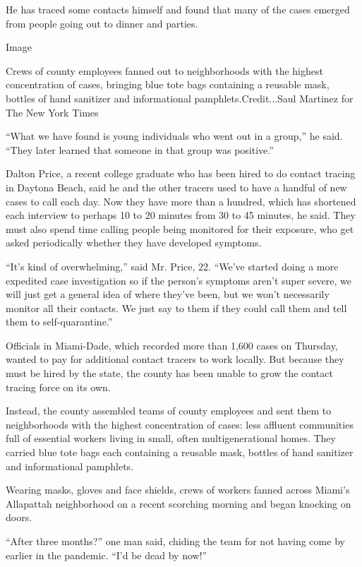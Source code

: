 He has traced some contacts himself and found that many of the cases
emerged from people going out to dinner and parties.

Image

Crews of county employees fanned out to neighborhoods with the highest
concentration of cases, bringing blue tote bags containing a reusable
mask, bottles of hand sanitizer and informational
pamphlets.Credit...Saul Martinez for The New York Times

``What we have found is young individuals who went out in a group,'' he
said. ``They later learned that someone in that group was positive.''

Dalton Price, a recent college graduate who has been hired to do contact
tracing in Daytona Beach, said he and the other tracers used to have a
handful of new cases to call each day. Now they have more than a
hundred, which has shortened each interview to perhaps 10 to 20 minutes
from 30 to 45 minutes, he said. They must also spend time calling people
being monitored for their exposure, who get asked periodically whether
they have developed symptoms.

``It's kind of overwhelming,'' said Mr. Price, 22. ``We've started doing
a more expedited case investigation so if the person's symptoms aren't
super severe, we will just get a general idea of where they've been, but
we won't necessarily monitor all their contacts. We just say to them if
they could call them and tell them to self-quarantine.''

Officials in Miami-Dade, which recorded more than 1,600 cases on
Thursday, wanted to pay for additional contact tracers to work locally.
But because they must be hired by the state, the county has been unable
to grow the contact tracing force on its own.

Instead, the county assembled teams of county employees and sent them to
neighborhoods with the highest concentration of cases: less affluent
communities full of essential workers living in small, often
multigenerational homes. They carried blue tote bags each containing a
reusable mask, bottles of hand sanitizer and informational pamphlets.

Wearing masks, gloves and face shields, crews of workers fanned across
Miami's Allapattah neighborhood on a recent scorching morning and began
knocking on doors.

``After three months?'' one man said, chiding the team for not having
come by earlier in the pandemic. ``I'd be dead by now!''


